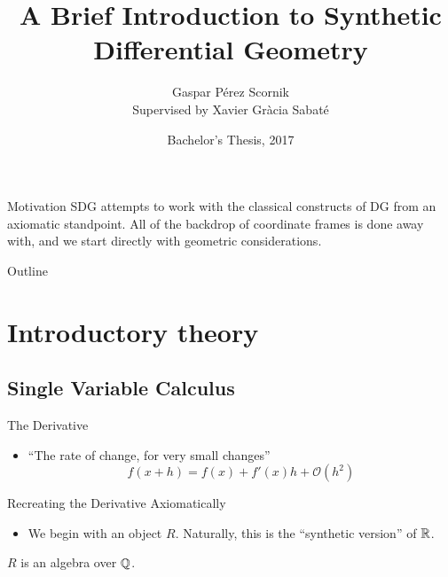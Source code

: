 \documentclass{beamer}
\title[Synthetic Differential Geometry] %
{A Brief Introduction to Synthetic Differential Geometry}
\author
{
  Gaspar P\'erez Scornik\\
  {\footnotesize Supervised by Xavier Gr\`acia Sabat\'e}
}
\institute[UPC] %
{
  Universitat Polit\'ecnica de Catalunya\\
  Faculty of Mathematics and Statistics
}
\date[BSCT 2017] %
{Bachelor's Thesis, 2017}
\begin{document}
\begin{frame}
  \titlepage
\end{frame}

\begin{frame}{Motivation}
  \pause
  {
    SDG attempts to work with the classical
    constructs of DG from an axiomatic standpoint. All of the backdrop of coordinate
    frames is done away with, and we start directly with geometric considerations.
  }
\end{frame}

\begin{frame}{Outline}
  \tableofcontents
\end{frame}

\section{Introductory theory}

\subsection{Single Variable Calculus}

\begin{frame}{The Derivative}

  \begin{itemize}
  \item
    ``The rate of change, for very small changes''
    \begin{equation*}
      f(x+h) = f(x) + f'(x)h + \mathcal O(h^2)
    \end{equation*}
  \end{itemize}
\end{frame}

\begin{frame}{Recreating the Derivative Axiomatically}

  \begin{itemize}
  \item 
    We begin with an object \( R \). Naturally, this is the ``synthetic version''
    of \( \mathbb{R} \).
  \end{itemize}
  \pause
  \begin{axiom}
    \( R \) is an algebra over \( \mathbb{Q} \).
  \end{axiom}
\end{frame}
\end{document}
